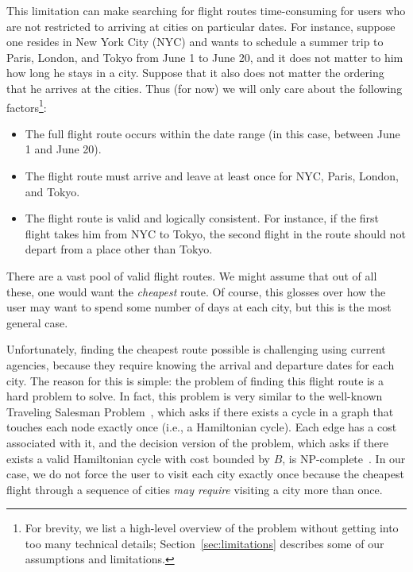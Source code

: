 \documentclass{article}
\begin{document}
This limitation can make searching for flight routes time-consuming for users who are not restricted to arriving at cities on particular dates. For
instance, suppose one resides in New York City (NYC) and wants to schedule a summer trip to Paris, London, and Tokyo from June 1 to June 20, and it
does not matter to him how long he stays in a city. Suppose that it also does not matter the ordering that he arrives at the cities. Thus (for now) we
will only care about the following factors\footnote{For brevity, we list a high-level overview of the problem without getting into too many technical
details; Section~\ref{sec:limitations} describes some of our assumptions and limitations.}:

\begin{itemize}[noitemsep]
    \item The full flight route occurs within the date range (in this case, between June 1 and June 20).
    \item The flight route must arrive and leave at least once for NYC, Paris, London, and Tokyo.
    \item The flight route is valid and logically consistent. For instance, if the first flight takes him from NYC to Tokyo, the second flight in the
    route should not depart from a place other than Tokyo.
\end{itemize}

There are a vast pool of valid flight routes. We might assume that out of all these, one would want the \emph{cheapest} route. Of course, this glosses
over how the user may want to spend some number of days at each city, but this is the most general case.

Unfortunately, finding the cheapest route possible is challenging using current agencies, because they require knowing the arrival and departure dates
for each city. The reason for this is simple: the problem of finding this flight route is a hard problem to solve. In fact, this problem is very
similar to the well-known Traveling Salesman Problem~\cite{Applegate:2007:TSP:1374811}, which asks if there exists a cycle in a graph that touches
each node exactly once (i.e., a Hamiltonian cycle). Each edge has a cost associated with it, and the decision version of the problem, which asks if
there exists a valid Hamiltonian cycle with cost bounded by $B$, is NP-complete~\cite{Kar72}. In our case, we do not force the user to visit each
city exactly once because the cheapest flight through a sequence of cities \emph{may require} visiting a city more than once.
\end{document}
